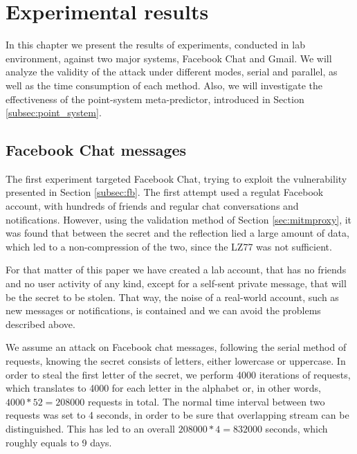 \chapter{Experimental results}\label{ch:experiment}

In this chapter we present the results of experiments, conducted in lab
environment, against two major systems, Facebook Chat and Gmail. We will analyze
the validity of the attack under different modes, serial and parallel, as well
as the time consumption of each method. Also, we will investigate the
effectiveness of the point-system meta-predictor, introduced in Section
\ref{subsec:point_system}.

\section{Facebook Chat messages}\label{sec:fb_experiment}

The first experiment targeted Facebook Chat, trying to exploit the vulnerability
presented in Section \ref{subsec:fb}. The first attempt used a regulat Facebook
account, with hundreds of friends and regular chat conversations and
notifications. However, using the validation method of Section
\ref{sec:mitmproxy}, it was found that between the secret and the reflection
lied a large amount of data, which led to a non-compression of the two, since
the LZ77 was not sufficient.

For that matter of this paper we have created a lab account, that has no friends
and no user activity of any kind, except for a self-sent private message, that
will be the secret to be stolen. That way, the noise of a real-world account,
such as new messages or notifications, is contained and we can avoid the
problems described above.

We assume an attack on Facebook chat messages, following the serial method of
requests, knowing the secret consists of letters, either lowercase or uppercase.
In order to steal the first letter of the secret, we perform 4000 iterations of
requests, which translates to 4000 for each letter in the alphabet or, in other
words, \begin{math}4000*52=208000\end{math} requests in total. The normal time
interval between two requests was set to 4 seconds, in order to be sure that
overlapping stream can be distinguished. This has led to an overall
\begin{math}208000*4 = 832000\end{math} seconds, which roughly equals to 9 days.

